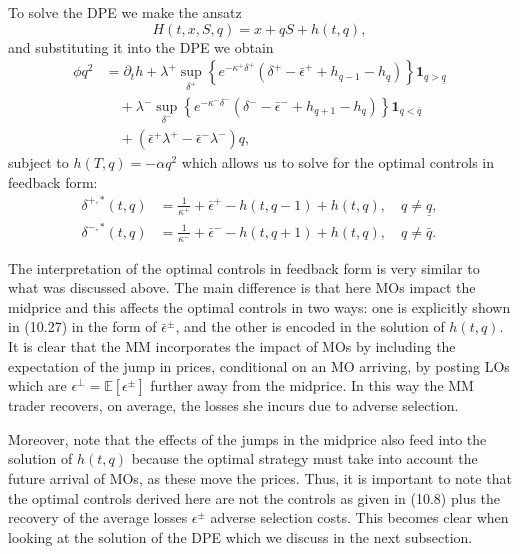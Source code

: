 \documentclass[11pt, a4paper]{book}
\newcommand{\E}{\mathbb{E}}
\newcommand{\Ind}{\mathbf{1}}
\begin{document}
	To solve the DPE we make the ansatz
	\begin{equation}
		H(t, x, S, q) = x + q S + h(t, q), \label{eq:10.25}
	\end{equation}
	and substituting it into the DPE we obtain
	\begin{equation}
		\begin{aligned}
			\phi q^2 &= \partial_t h + \lambda^+ \sup_{\delta^+} \left\{ e^{-\kappa^+ \delta^+} \left( \delta^+ - \bar{\epsilon}^+ + h_{q-1} - h_q \right) \right\} \Ind_{q > \underline{q}} \\
			&\quad + \lambda^- \sup_{\delta^-} \left\{ e^{-\kappa^- \delta^-} \left( \delta^- - \bar{\epsilon}^- + h_{q+1} - h_q \right) \right\} \Ind_{q < \bar{q}} \\
			&\quad + (\bar{\epsilon}^+ \lambda^+ - \bar{\epsilon}^- \lambda^-) q,
		\end{aligned} \label{eq:10.26}
	\end{equation}
	subject to $h(T, q) = -\alpha q^2$ which allows us to solve for the optimal controls in feedback form:
	\begin{subequations}
		\begin{align}
			\delta^{+, *}(t, q) &= \frac{1}{\kappa^+} + \bar{\epsilon}^+ - h(t, q-1) + h(t, q), \quad q \neq \underline{q}, \label{eq:10.27a} \\
			\delta^{-, *}(t, q) &= \frac{1}{\kappa^-} + \bar{\epsilon}^- - h(t, q+1) + h(t, q), \quad q \neq \bar{q}. \label{eq:10.27b}
		\end{align}
	\end{subequations}
	
	The interpretation of the optimal controls in feedback form is very similar to what was discussed above. The main difference is that here MOs impact the midprice and this affects the optimal controls in two ways: one is explicitly shown in (10.27) in the form of $\bar{\epsilon}^\pm$, and the other is encoded in the solution of $h(t, q)$.
	It is clear that the MM incorporates the impact of MOs by including the expectation of the jump in prices, conditional on an MO arriving, by posting LOs which are $\epsilon^\perp = \E[\epsilon^\pm]$ further away from the midprice. In this way the MM trader recovers, on average, the losses she incurs due to adverse selection.
	
	Moreover, note that the effects of the jumps in the midprice also feed into the solution of $h(t, q)$ because the optimal strategy must take into account the future arrival of MOs, as these move the prices. Thus, it is important to note that the optimal controls derived here are not the controls as given in (10.8) plus the recovery of the average losses $\epsilon^\pm$ adverse selection costs. This becomes clear when looking at the solution of the DPE which we discuss in the next subsection.
	
\end{document}
